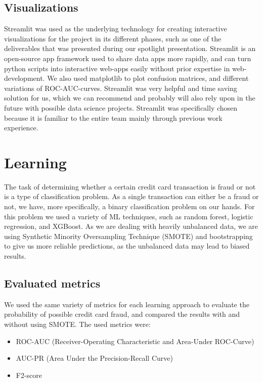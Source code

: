 \documentclass{article}
\begin{document}
\subsection{Visualizations}

Streamlit was used as the underlying technology for creating interactive visualizations for the project in its different phases, such as one of the deliverables that was presented during our spotlight presentation. Streamlit is an open-source app framework used to share data apps more rapidly, and can turn python scripts into interactive web-apps easily without prior expertise in web-development. We also used matplotlib to plot confusion matrices, and different variations of ROC-AUC-curves. Streamlit was very helpful and time saving solution for us, which we can recommend and probably will also rely upon in the future with possible data science projects. Streamlit was specifically chosen because it is familiar to the entire team mainly through previous work experience.

\section{Learning}

The task of determining whether a certain credit card transaction is fraud or not is a type of classification problem. As a single transaction can either be a fraud or not, we have, more specifically, a binary classification problem on our hands. For this problem we used a variety of ML techniques, such as random forest, logistic regression, and XGBoost. As we are dealing with heavily unbalanced data, we are using Synthetic Minority Oversampling Technique (SMOTE) and bootstrapping to give us more reliable predictions, as the unbalanced data may lead to biased results.

\subsection{Evaluated metrics}

We used the same variety of metrics for each learning approach to evaluate the probability of possible credit card fraud, and compared the results with and without using SMOTE. The used metrics were:

\begin{itemize}
    \item ROC-AUC (Receiver-Operating Characteristic and Area-Under ROC-Curve)
    \item AUC-PR (Area Under the Precision-Recall Curve)
    \item F2-score
\end{itemize}
\end{document}
